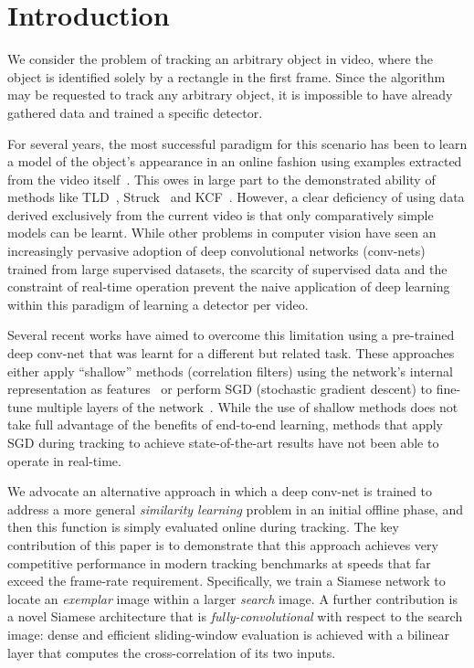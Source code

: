\documentclass[runningheads]{llncs}
\begin{document}
\section{Introduction}
We consider the problem of tracking an arbitrary object in video, where the object is identified solely by a rectangle in the first frame.
Since the algorithm may be requested to track any arbitrary object, it is impossible to have already gathered data and trained a specific detector.



For several years, the most successful paradigm for this scenario has been to learn a model of the object's appearance in an online fashion using examples extracted from the video itself~\cite{smeulders2014visual}.
This owes in large part to the demonstrated ability of methods like TLD~\cite{kalal2012tracking}, Struck~\cite{hare2011struck} and KCF~\cite{henriques2015high}.
However, a clear deficiency of using data derived exclusively from the current video is that only comparatively simple models can be learnt.
While other problems in computer vision have seen an increasingly pervasive adoption of deep convolutional networks (conv-nets) trained from large supervised datasets, the scarcity of supervised data and the constraint of real-time operation prevent the naive application of deep learning within this paradigm of learning a detector per video.

Several recent works have aimed to overcome this limitation using a pre-trained deep conv-net that was learnt for a different but related task.
These approaches either apply ``shallow'' methods (\eg correlation filters) using the network's internal representation as features~\cite{ma2015hierarchical,danelljan2015convolutional} or perform SGD (stochastic gradient descent) to fine-tune multiple layers of the network~\cite{wang2015transferring,wang2015visual,nam2015learning}.
While the use of shallow methods does not take full advantage of the benefits of end-to-end learning, methods that apply SGD during tracking to achieve state-of-the-art results have not been able to operate in real-time.

We advocate an alternative approach in which a deep conv-net is trained to address a more general \emph{similarity learning} problem in an initial offline phase, and then this function is simply evaluated online during tracking.
The key contribution of this paper is to demonstrate that this approach achieves very competitive performance in modern tracking benchmarks at speeds that far exceed the frame-rate requirement.
Specifically, we train a Siamese network to locate an \emph{exemplar} image within a larger \emph{search} image.
A further contribution is a novel Siamese architecture that is \emph{fully-convolutional} with respect to the search image: dense and efficient sliding-window evaluation is achieved with a bilinear layer that computes the cross-correlation of its two inputs.
\end{document}

